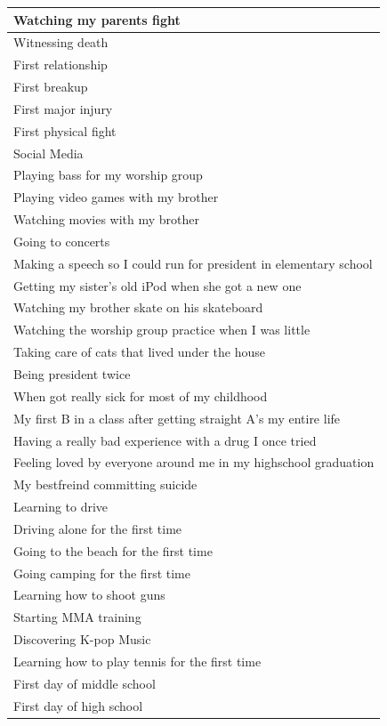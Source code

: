 \documentclass[
  .7em,
  letterpaper,
  DIV=11,
  numbers=noendperiod]{scrartcl}
\begin{document}
\begin{table}
\begin{tabular}{l}
\hline
Watching my parents fight\\
\hline
Witnessing death\\
\hline
First relationship\\
\hline
First breakup\\
\hline
First major injury\\
\hline
First physical fight\\
\hline
Social Media\\
\hline
Playing bass for my worship group\\
\hline
Playing video games with my brother\\
\hline
Watching movies with my brother\\
\hline
Going to concerts\\
\hline
Making a speech so I could run for president in elementary school\\
\hline
Getting my sister's old iPod when she got a new one\\
\hline
Watching my brother skate on his skateboard\\
\hline
Watching the worship group practice when I was little\\
\hline
Taking care of cats that lived under the house\\
\hline
Being president twice\\
\hline
When got really sick for most of my childhood\\
\hline
My first B in a class after getting straight A’s my entire life\\
\hline
Having a really bad experience with a drug I once tried\\
\hline
Feeling loved by everyone around me in my highschool graduation\\
\hline
My bestfreind committing suicide\\
\hline
Learning to drive\\
\hline
Driving alone for the first time\\
\hline
Going to the beach for the first time\\
\hline
Going camping for the first time\\
\hline
Learning how to shoot guns\\
\hline
Starting MMA training\\
\hline
Discovering K-pop Music\\
\hline
Learning how to play tennis for the first time\\
\hline
First day of middle school\\
\hline
First day of high school\\

\end{tabular}
\end{table}
\end{document}
